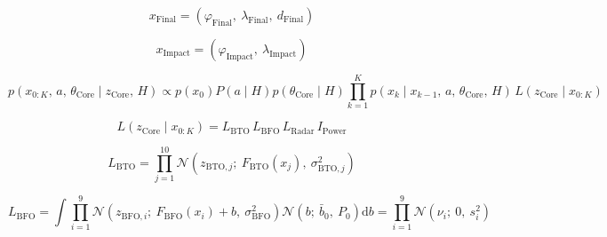 
\begin{equation}
  x_{\mathrm{Final}} = \left(\varphi_{\mathrm{Final}},\ \lambda_{\mathrm{Final}},\ d_{\mathrm{Final}}\right)
  \label{eq:1}
\end{equation}

\begin{equation}
  x_{\mathrm{Impact}} = \left(\varphi_{\mathrm{Impact}},\ \lambda_{\mathrm{Impact}}\right)
  \label{eq:2}
\end{equation}

\begin{equation}
  p\left(x_{0:K},\, a,\, \theta_{\mathrm{Core}} \mid z_{\mathrm{Core}},\, H\right) \propto p\left(x_{0}\right) P\left(a \mid H\right) p\left(\theta_{\mathrm{Core}} \mid H\right) \prod_{k=1}^{K} p\left(x_{k} \mid x_{k-1},\, a,\, \theta_{\mathrm{Core}},\, H\right)\, L\left(z_{\mathrm{Core}} \mid x_{0:K}\right)
  \label{eq:3}
\end{equation}

\begin{equation}
  L\left(z_{\mathrm{Core}} \mid x_{0:K}\right) = L_{\mathrm{BTO}}\, L_{\mathrm{BFO}}\, L_{\mathrm{Radar}}\, I_{\mathrm{Power}}
  \label{eq:4}
\end{equation}

\begin{equation}
  L_{\mathrm{BTO}} = \prod_{j=1}^{10} \mathcal{N}\left(z_{\mathrm{BTO},j};\ F_{\mathrm{BTO}}\left(x_{j}\right),\ \sigma_{\mathrm{BTO},j}^{2}\right)
  \label{eq:5}
\end{equation}

\begin{equation}
  L_{\mathrm{BFO}} = \int \prod_{i=1}^{9} \mathcal{N}\left(z_{\mathrm{BFO},i};\ F_{\mathrm{BFO}}\left(x_{i}\right) + b,\ \sigma_{\mathrm{BFO}}^{2}\right) \mathcal{N}\left(b;\ \bar{b}_{0},\ P_{0}\right) \mathrm{d}b = \prod_{i=1}^{9} \mathcal{N}\left(\nu_{i};\ 0,\ s_{i}^{2}\right)
  \label{eq:6}
\end{equation}

